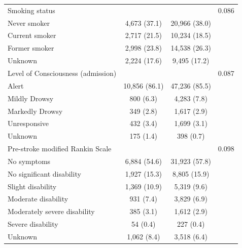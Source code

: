 \begin{table}[htbp]
\begin{threeparttable}
\begin{tabularx}{\textwidth}{@{}Xccc@{}}
      Smoking status                     &               &               & 0.086 \\ \quad Never smoker & 4,673 (37.1)        & 20,966 (38.0)
                                         &                                       \\ \quad Current smoker & 2,717 (21.5) & 10,234 (18.5) & \\ \quad Former
      smoker                             & 2,998 (23.8)  & 14,538 (26.3) &       \\ \quad Unknown & 2,224 (17.6)        & 9,495
      (17.2)                             &                                       \\

      Level of Consciousness (admission) &               &               & 0.087 \\ \quad Alert   & 10,856 (86.1)       &
      47,236 (85.5)                      &                                       \\ \quad Mildly Drowsy & 800 (6.3) & 4,283 (7.8) & \\ \quad
      Markedly Drowsy                    & 349 (2.8)     & 1,617 (2.9)   &       \\ \quad Unresponsive & 432 (3.4)           &
      1,699 (3.1)                        &                                       \\ \quad Unknown & 175 (1.4) & 398 (0.7) & \\

      Pre-stroke modified Rankin Scale   &               &               & 0.098 \\ \quad No symptoms & 6,884
      (54.6)                             & 31,923 (57.8) &                       \\ \quad No significant disability & 1,927 (15.3)        &
      8,805 (15.9)                       &                                       \\ \quad Slight disability & 1,369 (10.9) & 5,319 (9.6) & \\
      \quad Moderate disability          & 931 (7.4)     & 3,829 (6.9)   &       \\ \quad Moderately
      severe disability                  & 385 (3.1)     & 1,612 (2.9)   &       \\ \quad Severe disability & 54
      (0.4)                              & 227 (0.4)     &                       \\ \quad Unknown & 1,062 (8.4) & 3,518 (6.4) & \\


\end{tabularx}
\end{threeparttable}
\end{table}
